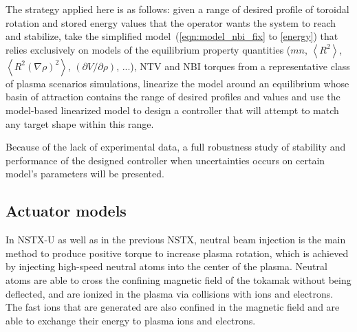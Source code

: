\documentclass[12pt,lot, lof]{puthesis}
\begin{document}
The strategy applied here is as follows: given a range of desired profile of toroidal rotation and stored energy values that
the operator wants the system to reach and stabilize,
take the simplified model~(\ref{eqn:model_nbi_fix} to \ref{energy}) that relies exclusively on models of the equilibrium property quantities ($m n$, $ \left<R^2\right>$, $\left< R^2 (\nabla \rho)^2\right> $, $ \left( {\partial V}/{\partial\rho}\right)$, ...),
NTV and NBI torques from a representative class of plasma scenarios simulations,
linearize the model around an equilibrium whose basin of attraction contains the range of desired profiles and values and use the model-based linearized model to design a controller that will attempt to match any target shape within this range.

Because of the lack of experimental data, a full robustness study of stability and performance of the designed controller when uncertainties occurs on certain model's parameters will be presented.

\subsection{Actuator models}
In NSTX-U as well as in the previous NSTX, neutral beam injection is the main method to produce positive torque to increase plasma rotation, which is achieved  by injecting high-speed neutral atoms into the center of the plasma. 
Neutral atoms are able to cross the confining magnetic field of the tokamak without being deflected, and are ionized in the plasma via collisions with ions and electrons. The fast ions that are generated are also confined in the magnetic field and are able to exchange their energy to plasma ions and electrons.
\end{document}
